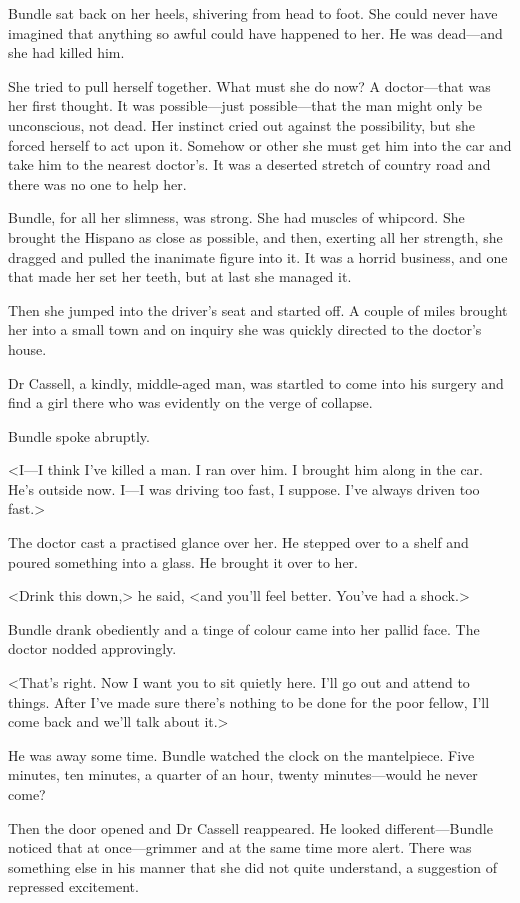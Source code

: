 Bundle sat back on her heels, shivering from head to foot. She could never have imagined that anything so awful could have happened to her. He was dead—and she had killed him.

She tried to pull herself together. What must she do now? A doctor—that was her first thought. It was possible—just possible—that the man might only be unconscious, not dead. Her instinct cried out against the possibility, but she forced herself to act upon it. Somehow or other she must get him into the car and take him to the nearest doctor's. It was a deserted stretch of country road and there was no one to help her.

Bundle, for all her slimness, was strong. She had muscles of whipcord. She brought the Hispano as close as possible, and then, exerting all her strength, she dragged and pulled the inanimate figure into it. It was a horrid business, and one that made her set her teeth, but at last she managed it.

Then she jumped into the driver's seat and started off. A couple of miles brought her into a small town and on inquiry she was quickly directed to the doctor's house.

Dr Cassell, a kindly, middle-aged man, was startled to come into his surgery and find a girl there who was evidently on the verge of collapse.

Bundle spoke abruptly.

<I—I think I've killed a man. I ran over him. I brought him along in the car. He's outside now. I—I was driving too fast, I suppose. I've always driven too fast.>

The doctor cast a practised glance over her. He stepped over to a shelf and poured something into a glass. He brought it over to her.

<Drink this down,> he said, <and you'll feel better. You've had a shock.>

Bundle drank obediently and a tinge of colour came into her pallid face. The doctor nodded approvingly.

<That's right. Now I want you to sit quietly here. I'll go out and attend to things. After I've made sure there's nothing to be done for the poor fellow, I'll come back and we'll talk about it.>

He was away some time. Bundle watched the clock on the mantelpiece. Five minutes, ten minutes, a quarter of an hour, twenty minutes—would he never come?

Then the door opened and Dr Cassell reappeared. He looked different—Bundle noticed that at once—grimmer and at the same time more alert. There was something else in his manner that she did not quite understand, a suggestion of repressed excitement.

